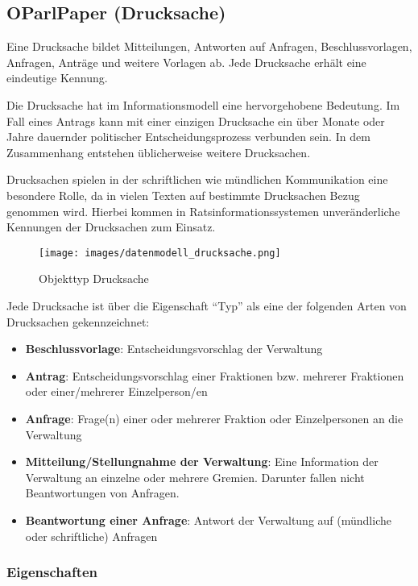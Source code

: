 \documentclass[,a4paper]{article}
\makeatletter
\def\maxwidth{\ifdim\Gin@nat@width>\linewidth\linewidth
\else\Gin@nat@width\fi}
\let\Oldincludegraphics\includegraphics
\renewcommand{\includegraphics}[1]{\Oldincludegraphics[width=\maxwidth]{#1}}
\makeatother
\begin{document}
\subsection{OParlPaper (Drucksache)}

Eine Drucksache bildet Mitteilungen, Antworten auf Anfragen,
Beschlussvorlagen, Anfragen, Anträge und weitere Vorlagen ab. Jede
Drucksache erhält eine eindeutige Kennung.

Die Drucksache hat im Informationsmodell eine hervorgehobene Bedeutung.
Im Fall eines Antrags kann mit einer einzigen Drucksache ein über Monate
oder Jahre dauernder politischer Entscheidungsprozess verbunden sein. In
dem Zusammenhang entstehen üblicherweise weitere Drucksachen.

Drucksachen spielen in der schriftlichen wie mündlichen Kommunikation
eine besondere Rolle, da in vielen Texten auf bestimmte Drucksachen
Bezug genommen wird. Hierbei kommen in Ratsinformationssystemen
unveränderliche Kennungen der Drucksachen zum Einsatz.

\begin{figure}[htbp]
\centering
\texttt{[image: images/datenmodell\_drucksache.png]}
\caption{Objekttyp Drucksache}
\end{figure}

Jede Drucksache ist über die Eigenschaft ``Typ'' als eine der folgenden
Arten von Drucksachen gekennzeichnet:

\begin{itemize}
\item
  \textbf{Beschlussvorlage}: Entscheidungsvorschlag der Verwaltung
\item
  \textbf{Antrag}: Entscheidungsvorschlag einer Fraktionen bzw. mehrerer
  Fraktionen oder einer/mehrerer Einzelperson/en
\item
  \textbf{Anfrage}: Frage(n) einer oder mehrerer Fraktion oder
  Einzelpersonen an die Verwaltung
\item
  \textbf{Mitteilung/Stellungnahme der Verwaltung}: Eine Information der
  Verwaltung an einzelne oder mehrere Gremien. Darunter fallen nicht
  Beantwortungen von Anfragen.
\item
  \textbf{Beantwortung einer Anfrage}: Antwort der Verwaltung auf
  (mündliche oder schriftliche) Anfragen
\end{itemize}

\subsubsection{Eigenschaften}
\end{document}
